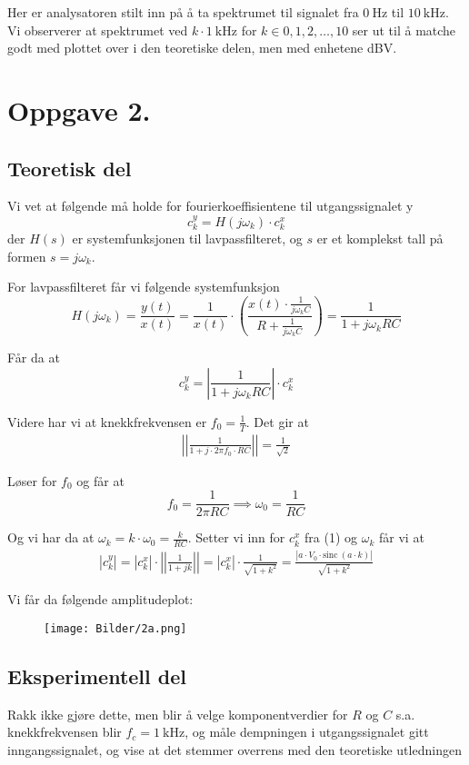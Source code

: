 \documentclass[a4paper,11pt,norsk]{article}
\begin{document}
Her er analysatoren stilt inn på å ta spektrumet til signalet fra $\SI{0}{\hertz}$ til $\SI{10}{\kilo\hertz}$. Vi observerer 
at spektrumet ved $k \cdot \SI{1}{\kilo\hertz}$ for $k \in {0, 1, 2, \dots, 10}$ ser ut til å 
matche godt med plottet over i den teoretiske delen, men med enhetene dBV.

\section*{Oppgave 2.}
\subsection*{Teoretisk del}
Vi vet at følgende må holde for fourierkoeffisientene til utgangssignalet y
\[
    c_k^{y} = H(j \omega_k) \cdot c_k^{x}
\]
der $H(s)$ er systemfunksjonen til lavpassfilteret, og $s$ er et komplekst tall på formen $s = j \omega_k$.

For lavpassfilteret får vi følgende systemfunksjon
\[
    H(j\omega_k) = \frac{y(t)}{x(t)} = \frac{1}{x(t)} \cdot \left(\frac{x(t) \cdot \frac{1}{j\omega_k C}}{R + \frac{1}{j\omega_k C}}\right) = \frac{1}{1 + j\omega_k RC}
\]

Får da at 
\[
    c_k^y = \left\lvert\frac{1}{1 + j\omega_k RC}\right\rvert \cdot c_k^x 
\]

Videre har vi at knekkfrekvensen er $f_0 = \frac{1}{T}$. Det gir at
\begin{align*}
    \left\lvert\left\lvert \frac{1}{1 + j \cdot 2\pi f_0 \cdot RC} \right\rvert\right\rvert = \frac{1}{\sqrt{2}}
\end{align*}

Løser for $f_0$ og får at
\[
    f_0 = \frac{1}{2\pi RC} \implies \omega_0 = \frac{1}{RC}
\]

Og vi har da at $\omega_k = k \cdot \omega_0 = \frac{k}{RC}$. Setter vi inn for $c_k^x$ fra (1) og $\omega_k$ får vi at 
\begin{align*}
    |c_k^y| = |c_k^x| \cdot \left\lvert\left\lvert\frac{1}{1 + jk}\right\rvert\right\rvert = |c_k^x| \cdot \frac{1}{\sqrt{1 + k^2}} = \frac{|a \cdot V_0 \cdot \text{sinc}\:{\left(a \cdot k\right)}|}{\sqrt{1 + k^2}}
\end{align*}

Vi får da følgende amplitudeplot:
\begin{figure}[H]
    \centering
    \texttt{[image: Bilder/2a.png]} 
\end{figure}

\subsection*{Eksperimentell del}
Rakk ikke gjøre dette, men blir å velge komponentverdier for $R$ og $C$ s.a. knekkfrekvensen blir $f_c = \SI{1}{\kilo\hertz}$, og måle 
dempningen i utgangssignalet gitt inngangssignalet, og vise at det stemmer overrens med den teoretiske utledningen
\end{document}
